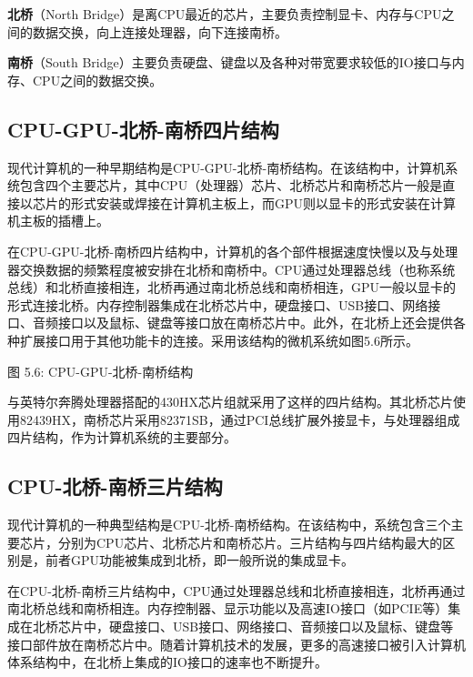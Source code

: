 \documentclass[]{ctexbook}
\begin{document}
\textbf{北桥}（North Bridge）是离CPU最近的芯片，主要负责控制显卡、内存与CPU之间的数据交换，向上连接处理器，向下连接南桥。

\textbf{南桥}（South Bridge）主要负责硬盘、键盘以及各种对带宽要求较低的IO接口与内存、CPU之间的数据交换。

\hypertarget{cpu-gpu-ux5317ux6865-ux5357ux6865ux56dbux7247ux7ed3ux6784}{%
\subsection{CPU-GPU-北桥-南桥四片结构}\label{cpu-gpu-ux5317ux6865-ux5357ux6865ux56dbux7247ux7ed3ux6784}}

现代计算机的一种早期结构是CPU-GPU-北桥-南桥结构。在该结构中，计算机系统包含四个主要芯片，其中CPU（处理器）芯片、北桥芯片和南桥芯片一般是直接以芯片的形式安装或焊接在计算机主板上，而GPU则以显卡的形式安装在计算机主板的插槽上。

在CPU-GPU-北桥-南桥四片结构中，计算机的各个部件根据速度快慢以及与处理器交换数据的频繁程度被安排在北桥和南桥中。CPU通过处理器总线（也称系统总线）和北桥直接相连，北桥再通过南北桥总线和南桥相连，GPU一般以显卡的形式连接北桥。内存控制器集成在北桥芯片中，硬盘接口、USB接口、网络接口、音频接口以及鼠标、键盘等接口放在南桥芯片中。此外，在北桥上还会提供各种扩展接口用于其他功能卡的连接。采用该结构的微机系统如图5.6所示。

图 5.6: CPU-GPU-北桥-南桥结构

与英特尔奔腾处理器搭配的430HX芯片组就采用了这样的四片结构。其北桥芯片使用82439HX，南桥芯片采用82371SB，通过PCI总线扩展外接显卡，与处理器组成四片结构，作为计算机系统的主要部分。

\hypertarget{cpu-ux5317ux6865-ux5357ux6865ux4e09ux7247ux7ed3ux6784}{%
\subsection{CPU-北桥-南桥三片结构}\label{cpu-ux5317ux6865-ux5357ux6865ux4e09ux7247ux7ed3ux6784}}

现代计算机的一种典型结构是CPU-北桥-南桥结构。在该结构中，系统包含三个主要芯片，分别为CPU芯片、北桥芯片和南桥芯片。三片结构与四片结构最大的区别是，前者GPU功能被集成到北桥，即一般所说的集成显卡。

在CPU-北桥-南桥三片结构中，CPU通过处理器总线和北桥直接相连，北桥再通过南北桥总线和南桥相连。内存控制器、显示功能以及高速IO接口（如PCIE等）集成在北桥芯片中，硬盘接口、USB接口、网络接口、音频接口以及鼠标、键盘等接口部件放在南桥芯片中。随着计算机技术的发展，更多的高速接口被引入计算机体系结构中，在北桥上集成的IO接口的速率也不断提升。
\end{document}
